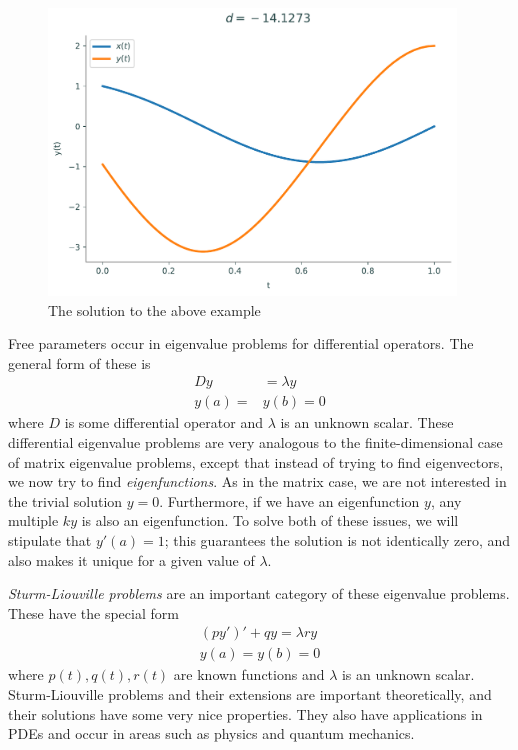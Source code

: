 \begin{figure}[H]
    \centering
    \includegraphics[height=3in]{figures/bvp_param_example.pdf}
    \caption{The solution to the above example}
\end{figure}

Free parameters occur in eigenvalue problems for differential operators.
The general form of these is
\begin{align*}
Dy&=\lambda y \\
y(a)=&y(b)=0
\end{align*}
where \(D\) is some differential operator and \(\lambda\) is an unknown scalar.
These differential eigenvalue problems are very analogous to the finite-dimensional case of matrix eigenvalue problems, except that instead of trying to find eigenvectors, we now try to find \textit{eigenfunctions}.
As in the matrix case, we are not interested in the trivial solution \(y=0\).
Furthermore, if we have an eigenfunction \(y\), any multiple \(ky\) is also an eigenfunction.
To solve both of these issues, we will stipulate that \(y'(a)=1\); this guarantees the solution is not identically zero, and also makes it unique for a given value of \(\lambda\). %

\textit{Sturm-Liouville problems} are an important category of these eigenvalue problems.
These have the special form
\begin{align*}
(py')'+qy = \lambda ry \\
y(a)=y(b)=0
\end{align*}
where \(p(t), q(t), r(t)\) are known functions and \(\lambda\) is an unknown scalar.
Sturm-Liouville problems and their extensions are important theoretically, and their solutions have some very nice properties.
They also have applications in PDEs and occur in areas such as physics and quantum mechanics.

